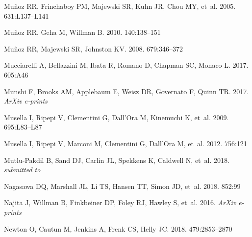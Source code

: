 \documentclass[a4paper]{ar-1col}
\begin{document}
\begin{thebibliography}{}
{Mu{\~n}oz} RR, {Frinchaboy} PM, {Majewski} SR, {Kuhn} JR, {Chou} MY, et~al.
  2005.
\textit{\apjl} 631:L137--L141

{Mu{\~n}oz} RR, {Geha} M, {Willman} B. 2010.
\textit{\aj} 140:138--151

{Mu{\~n}oz} RR, {Majewski} SR, {Johnston} KV. 2008.
\textit{\apj} 679:346--372

{Mucciarelli} A, {Bellazzini} M, {Ibata} R, {Romano} D, {Chapman} SC, {Monaco}
  L. 2017.
\textit{\aap} 605:A46

{Munshi} F, {Brooks} AM, {Applebaum} E, {Weisz} DR, {Governato} F, {Quinn} TR.
  2017.
\textit{ArXiv e-prints}

{Musella} I, {Ripepi} V, {Clementini} G, {Dall'Ora} M, {Kinemuchi} K, et~al.
  2009.
\textit{\apjl} 695:L83--L87

{Musella} I, {Ripepi} V, {Marconi} M, {Clementini} G, {Dall'Ora} M, et~al.
  2012.
\textit{\apj} 756:121

{Mutlu-Pakdil} B, {Sand} DJ, {Carlin} JL, {Spekkens} K, {Caldwell} N, et~al.
  2018.
\textit{submitted to \apj}

{Nagasawa} DQ, {Marshall} JL, {Li} TS, {Hansen} TT, {Simon} JD, et~al. 2018.
\textit{\apj} 852:99

{Najita} J, {Willman} B, {Finkbeiner} DP, {Foley} RJ, {Hawley} S, et~al. 2016.
\textit{ArXiv e-prints}

{Newton} O, {Cautun} M, {Jenkins} A, {Frenk} CS, {Helly} JC. 2018.
\textit{\mnras} 479:2853--2870


\end{thebibliography}
\end{document}
